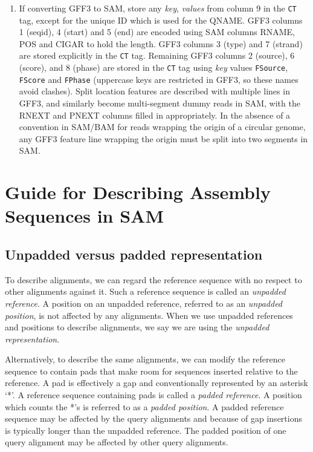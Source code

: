 \documentclass[10pt]{article}
\begin{document}
\begin{enumerate}
\begin{enumerate}[label=\arabic*]
\begin{center}
\begin{tabular}{llrcl}
    \end{tabular}\end{center}
  \item If converting GFF3 to SAM, store any \emph{key}, \emph{values}
  from column 9 in the {\tt CT} tag, except for the unique ID which
  is used for the QNAME. GFF3 columns 1 (seqid), 4 (start) and 5 (end)
  are encoded using SAM columns RNAME, POS and CIGAR to hold the length.
  GFF3 columns 3 (type) and 7 (strand) are stored explicitly in the
  {\tt CT} tag. Remaining GFF3 columns 2 (source), 6 (score), and
  8 (phase) are stored in the {\tt CT} tag using \emph{key} values
  {\tt FSource}, {\tt FScore} and {\tt FPhase} (uppercase keys are
  restricted in GFF3, so these names avoid clashes). Split location
  features are described with multiple lines in GFF3, and similarly
  become multi-segment dummy reads in SAM, with the {\sf RNEXT} and
  {\sf PNEXT} columns filled in appropriately. In the absence of a
  convention in SAM/BAM for reads wrapping the origin of a circular
  genome, any GFF3 feature line wrapping the origin must be split into
  two segments in SAM.
  \end{enumerate}
\end{enumerate}

\section{Guide for Describing Assembly Sequences in SAM}

\subsection{Unpadded versus padded representation}

To describe alignments, we can regard the reference sequence with no respect to
other alignments against it.  Such a reference sequence is called an
\emph{unpadded reference}. A position on an unpadded reference, referred to
as an \emph{unpadded position}, is not affected by any alignments. When we use
unpadded references and positions to describe alignments, we say we are using
the \emph{unpadded representation}.

Alternatively, to describe the same alignments, we can modify the reference
sequence to contain pads that make room for sequences inserted relative to the
reference. A pad is effectively a gap and conventionally represented by an
asterisk `*'.  A reference sequence containing pads is called a \emph{padded
reference}. A position which counts the *'s is referred to as a \emph{padded
position}. A padded reference sequence may be affected by the query alignments
and because of gap insertions is typically longer than the unpadded reference.
The padded position of one query alignment may be affected by other query
alignments.
\end{document}
